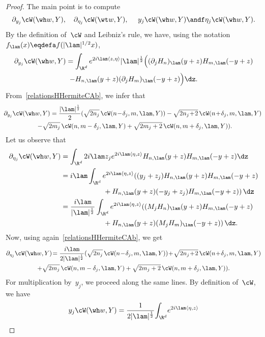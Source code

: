 \begin{proof}
The main point is to compute
\[
\partial_{y_j} \cW(\wh w,Y),\quad\partial_{\eta_j} \cW(\wt w,Y),\quad\ y_j \cW(\wh w,Y)\andf \eta_j \cW(\wh w,Y).
\]
By the definition of~$\cW$ and Leibniz's rule, we have, using the notation $f_\lam(x)\eqdefa f(|\lam|^{1/2}x)$,
\begin{multline*}
\partial_{y_j} \cW(\wh w,Y) = \int_{\R^d} e^{2i\lam\langle z,\eta\rangle } |\lam|^{\frac 12}
\Big((\partial_jH_n)_{\lam} (y+z) H_{m,\lam} (-y+z) \\ -H_{n,\lam} (y+z) (\partial_jH_m)_\lam (-y+z) \Big)\dz.
\end{multline*}
From~\eqref{relationsHHermiteCAb}, we infer that
\begin{multline}\label{actionX_jonFHdemoeq1}
\!\!\partial_{y_j} \cW(\wh w,Y) = \frac {|\lam|^{\frac 12}} 2 (\sqrt {2n_j}\, \cW(n\!-\!\delta_j,m,\lam,Y)) -\sqrt {2n_j\!+\!2}\, \cW(n\!+\!\delta_j,m,\lam,Y) \\
-\sqrt {2m_j}\,\cW(n,m-\delta_j,\lam,Y) +\sqrt {2m_j+2}\,\cW(n,m+\delta_j,\lam,Y)).\!\!
\end{multline}
Let us observe that
\[
\begin{aligned}
\partial_{\eta_j} \cW(\wh w,Y) & = \int_{\R^d} 2i\lam z_j e^{2i\lam\langle \eta,z\rangle} H_{n,\lam}(y+z)H_{m,\lam} (-y+z) \dz\\
& = i\lam \int_{\R^d} e^{2i\lam\langle \eta,z\rangle}((y_j+z_j) H_{n,\lam}(y+z)H_{m,\lam} (-y+z) \\
& \qquad\qquad\qquad + H_{n,\lam}(y+z)(-y_j+z_j)H_{m,\lam} (-y+z))\,\dz\\
&= \frac {i\lam} {|\lam|^{\frac 12} }\int_{\R^d}e^{2i\lam\langle \eta,z\rangle} ((M_jH_{n})_\lam(y+z)H_{m,\lam} (-y+z) \\
& \qquad\qquad\qquad +H_{n,\lam}(y+z) (M_jH_m)_\lam(-y+z))\,\dz.
\end{aligned}
\]
Now, using again~\eqref{relationsHHermiteCAb}, we get
\begin{multline}\label{actionX_jonFHdemoeq2}
\partial_{\eta_j} \cW(\wh w,Y) \!= \frac {i\lam} {2|\lam|^{\frac 12} }(\sqrt {2n_j}\, \cW(n\!-\!\delta_j,m,\lam,Y) )
\!+\!\sqrt {2n_j\!+\!2}\, \cW(n\!+\!\delta_j,m,\lam,Y) \\
+\sqrt {2m_j}\,\cW(n,m-\delta_j,\lam,Y) +\sqrt {2m_j+2}\,\cW(n,m+\delta_j,\lam,Y)).
\end{multline}
For multiplication by~$y_j$, we proceed along the same lines. By definition of~$\cW$, we have
\begin{multline*}
y_j\cW(\wh w,Y) =\frac 1 {2|\lam|^{\frac12}}\! \int_{\R^d}\! e^{2i\lam\langle \eta,z\rangle}

\end{multline*}
\end{proof}

